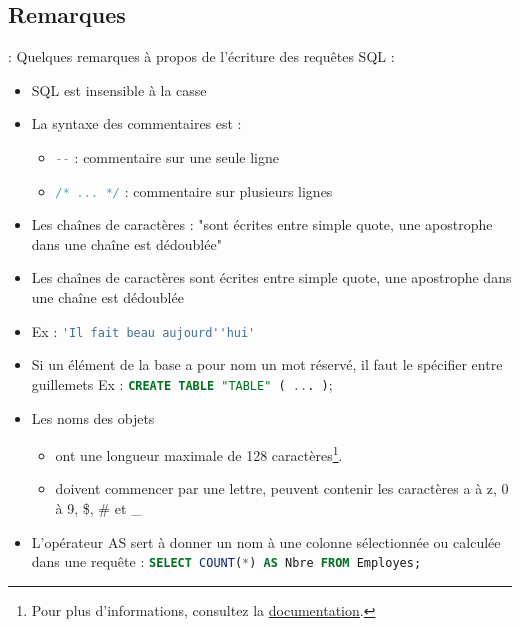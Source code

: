 \documentclass[10pt]{beamer}
\begin{document}
\subsection{Remarques}
\begin{frame}[allowframebreaks]{\secname : \subsecname}
    Quelques remarques à propos de l'écriture des requêtes SQL :
    \begin{itemize}
        \item SQL est insensible à la casse
        \item La syntaxe des commentaires est :
              \begin{itemize}
                  \item  \lstinline[language=sql]!--! : commentaire sur une seule ligne
                  \item  \lstinline[language=sql]!/* ... */! : commentaire sur plusieurs lignes
              \end{itemize}
        \item Les chaînes de caractères : "sont écrites entre simple quote, une apostrophe dans une chaîne est dédoublée"
        \item Les chaînes de caractères sont écrites entre simple quote, une apostrophe dans une chaîne est dédoublée
        \item Ex : \lstinline[language=sql]!'Il fait beau aujourd''hui'!
        \item  Si un élément de la base a pour nom un mot réservé, il faut le spécifier entre guillemets
              Ex : \lstinline[language=sql]!CREATE TABLE "TABLE" ( ... )!;
        \item Les noms des objets
              \begin{itemize}
                  \item ont une longueur maximale de 128 caractères\footnote{Pour plus d'informations, consultez la \href{https://docs.oracle.com/en/database/oracle/oracle-database/12.2/refrn/ALL_OBJECTS.html\#GUID-AA6DEF8B-F04F-482A-8440-DBCB18F6C976}{documentation}.}.
                  \item doivent commencer par une lettre, peuvent contenir les caractères a à z, 0 à 9, \$, \# et \_
              \end{itemize}
        \item L'opérateur AS sert à donner un nom à une colonne sélectionnée ou calculée dans une requête : \lstinline[language=sql]!SELECT COUNT(*) AS Nbre FROM Employes;!
    \end{itemize}
\end{frame}
\end{document}
